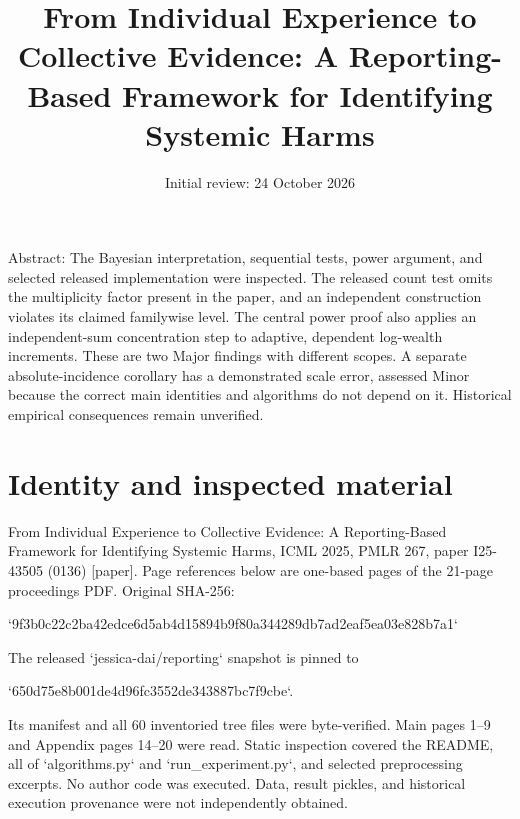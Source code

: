 \documentclass[10pt]{article}
\title{From Individual Experience to Collective Evidence: A Reporting-Based Framework for Identifying Systemic Harms}
\author{}
\date{Initial review: 24 October 2026}
\begin{document}
\maketitle
Abstract: The Bayesian interpretation, sequential tests, power argument, and selected released implementation were inspected. The released count test omits the multiplicity factor present in the paper, and an independent construction violates its claimed familywise level. The central power proof also applies an independent-sum concentration step to adaptive, dependent log-wealth increments. These are two Major findings with different scopes. A separate absolute-incidence corollary has a demonstrated scale error, assessed Minor because the correct main identities and algorithms do not depend on it. Historical empirical consequences remain unverified.\par
\section*{Identity and inspected material}
From Individual Experience to Collective Evidence: A Reporting-Based Framework for Identifying Systemic Harms, ICML 2025, PMLR 267, paper I25-43505 (0136) [paper]. Page references below are one-based pages of the 21-page proceedings PDF. Original SHA-256:\par
`9f3b0c22c2ba42edce6d5ab4d15894b9f80a344289db7ad2eaf5ea03e828b7a1`\par
The released `jessica-dai/reporting` snapshot is pinned to\par
`650d75e8b001de4d96fc3552de343887bc7f9cbe`.\par
Its manifest and all 60 inventoried tree files were byte-verified. Main pages 1–9 and Appendix pages 14–20 were read. Static inspection covered the README, all of `algorithms.py` and `run\_experiment.py`, and selected preprocessing excerpts. No author code was executed. Data, result pickles, and historical execution provenance were not independently obtained.\par
\end{document}
